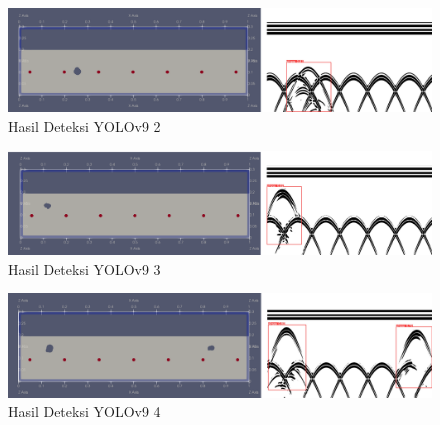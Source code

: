 \begin{figure} [H] \centering
    \includegraphics[scale=0.2]{gambar/bab4/yolo2.png}
    \caption{Hasil Deteksi YOLOv9 2}
\end{figure}

\begin{figure} [H] \centering
    \includegraphics[scale=0.2]{gambar/bab4/yolo3.png}
    \caption{Hasil Deteksi YOLOv9 3}
\end{figure}

\begin{figure} [H] \centering
    \includegraphics[scale=0.2]{gambar/bab4/yolo4.png}
    \caption{Hasil Deteksi YOLOv9 4}
\end{figure}
